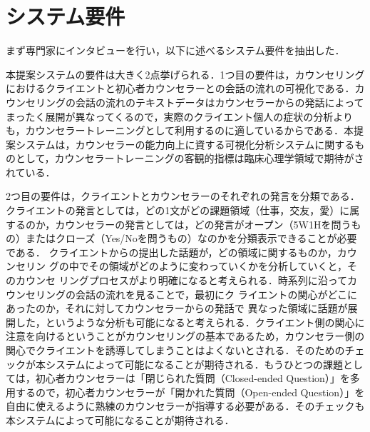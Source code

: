 \documentclass[shuuron]{kuee}
\begin{document}
\section{システム要件}




まず専門家にインタビューを行い，以下に述べるシステム要件を抽出した．




本提案システムの要件は大きく2点挙げられる．1つ目の要件は，カウンセリングにおけるクライエントと初心者カウンセラーとの会話の流れの可視化である．カウンセリングの会話の流れのテキストデータはカウンセラーからの発話によってまったく展開が異なってくるので，実際のクライエント個人の症状の分析よりも，カウンセラートレーニングとして利用するのに適しているからである．本提案システムは，カウンセラーの能力向上に資する可視化分析システムに関するものとして，カウンセラートレーニングの客観的指標は臨床心理学領域で期待がされている．


2つ目の要件は，クライエントとカウンセラーのそれぞれの発言を分類である．クライエントの発言としては，どの1文がどの課題領域（仕事，交友，愛）に属するのか，カウンセラーの発言としては，どの発言がオープン（5W1Hを問うもの）またはクローズ（Yes/Noを問うもの）なのかを分類表示できることが必要である．
クライエントからの提出した話題が，どの領域に関するものか，カウンセリン
グの中でその領域がどのように変わっていくかを分析していくと，そのカウンセ
リングプロセスがより明確になると考えられる．時系列に沿ってカウンセリングの会話の流れを見ることで，最初にク
ライエントの関心がどこにあったのか，それに対してカウンセラーからの発話で
異なった領域に話題が展開した，というような分析も可能になると考えられる．クライエント側の関心に注意を向けるということがカウンセリングの基本であるため，カウンセラー側の関心でクライエントを誘導してしまうことはよくないとされる．そのためのチェックが本システムによって可能になることが期待される．もうひとつの課題としては，初心者カウンセラーは「閉じられた質問（Closed-ended Question）」を多用するので，初心者カウンセラーが「開かれた質問（Open-ended Question）」を自由に使えるように熟練のカウンセラーが指導する必要がある．そのチェックも本システムによって可能になることが期待される．


\end{document}
